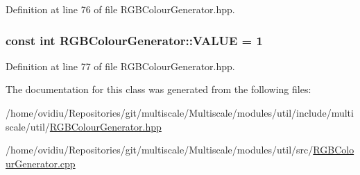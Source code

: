 Definition at line 76 of file R\-G\-B\-Colour\-Generator.\-hpp.

\hypertarget{classmultiscale_1_1RGBColourGenerator_a859abef56e015354d032c46680132850}{
\subsubsection[{V\-A\-L\-U\-E}]{\setlength{\rightskip}{0pt plus 5cm}const int R\-G\-B\-Colour\-Generator\-::\-V\-A\-L\-U\-E = 1\hspace{0.3cm}{\ttfamily [static]}}}\label{classmultiscale_1_1RGBColourGenerator_a859abef56e015354d032c46680132850}


Definition at line 77 of file R\-G\-B\-Colour\-Generator.\-hpp.



The documentation for this class was generated from the following files\-:\begin{DoxyCompactItemize}
\item 
/home/ovidiu/\-Repositories/git/multiscale/\-Multiscale/modules/util/include/multiscale/util/\hyperlink{RGBColourGenerator_8hpp}{R\-G\-B\-Colour\-Generator.\-hpp}\item 
/home/ovidiu/\-Repositories/git/multiscale/\-Multiscale/modules/util/src/\hyperlink{RGBColourGenerator_8cpp}{R\-G\-B\-Colour\-Generator.\-cpp}\end{DoxyCompactItemize}
